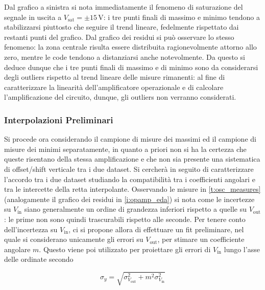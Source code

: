 \documentclass[a4paper,11pt]{article} %
\begin{document}
\noindent Dal grafico a sinistra si nota immediatamente il fenomeno di saturazione del segnale in uscita a
$V_{\text{sat}}=\pm15\,\si{\volt}$: i tre punti finali di massimo e minimo tendono a stabilizzarsi piuttosto che seguire
il trend lineare, fedelmente rispettato dai restanti punti del grafico. Dal grafico dei residui si può osservare lo
stesso fenomeno: la zona centrale risulta essere distribuita ragionevolmente attorno allo zero, mentre le code tendono a
distanziarsi anche notevolmente. Da questo si deduce dunque che i tre punti finali di massimo e di minimo sono da
considerarsi degli outliers rispetto al trend lineare delle misure rimanenti: al fine di caratterizzare la linearità
dell'amplificatore operazionale e di calcolare l'amplificazione del circuito, dunque, gli outliers non verranno
considerati.


\subsubsection{Interpolazioni Preliminari}\label{s:pre} Si procede ora considerando il campione di misure dei massimi ed
il campione di misure dei minimi separatamente, in quanto a priori non si ha la certezza che queste risentano della
stessa amplificazione e che non sia presente una sistematica di offset/shift verticale tra i due dataset. Si cercherà in
seguito di caratterizzare l'accordo tra i due dataset studiando la compatibilità tra i coefficienti angolari e tra le
intercette della retta interpolante. Osservando le misure in  \autoref{t:osc_measures} (analogamente il grafico dei residui
in \autoref{i:opamp_eda}) si nota come le incertezze su $V_{\text{in}}$ siano generalmente un ordine di grandezza
inferiori rispetto a quelle su $V_{\text{out}}$: le prime non sono quindi trascurabili rispetto alle seconde. Per tenere
conto dell'incertezza su $V_{\text{in}}$, ci si propone allora di effettuare un fit preliminare, nel quale si
considerano unicamente gli errori su $V_{\text{out}}$, per stimare un coefficiente angolare $m$. Questo viene poi
utilizzato per proiettare gli errori di $V_{\text{in}}$ lungo l'asse delle ordinate secondo 

\begin{equation}\label{e:proj}
	\sigma_{y} = \sqrt{	\sigma_{V_{\text{out}}}^2	+	m^2	\sigma_{V_{\text{in}}}^2	}
\end{equation}
\end{document}

